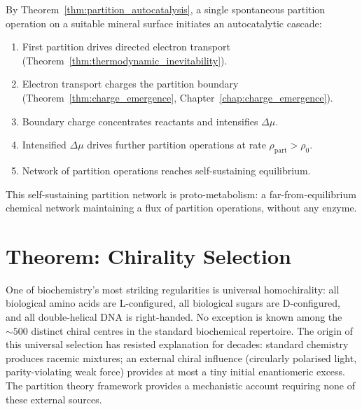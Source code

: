 \begin{corollary}
\label{cor:partition_cascade}
By Theorem~\ref{thm:partition_autocatalysis}, a single spontaneous partition
operation on a suitable mineral surface initiates an autocatalytic cascade:
\begin{enumerate}[label=(\arabic*)]
  \item First partition drives directed electron transport (Theorem~\ref{thm:thermodynamic_inevitability}).
  \item Electron transport charges the partition boundary
        (Theorem~\ref{thm:charge_emergence}, Chapter~\ref{chap:charge_emergence}).
  \item Boundary charge concentrates reactants and intensifies $\Delta\mu$.
  \item Intensified $\Delta\mu$ drives further partition operations at rate
        $\rho_{\mathrm{part}} > \rho_0$.
  \item Network of partition operations reaches self-sustaining equilibrium.
\end{enumerate}
This self-sustaining partition network is proto-metabolism: a far-from-equilibrium
chemical network maintaining a flux of partition operations, without any enzyme.
\end{corollary}

\section{Theorem: Chirality Selection}
\label{sec:chirality_selection}

One of biochemistry's most striking regularities is universal homochirality:
all biological amino acids are L-configured, all biological sugars are
D-configured, and all double-helical DNA is right-handed. No exception is known
among the $\sim 500$ distinct chiral centres in the standard biochemical repertoire.
The origin of this universal selection has resisted explanation for decades:
standard chemistry produces racemic mixtures; an external chiral influence
(circularly polarised light, parity-violating weak force) provides at most
a tiny initial enantiomeric excess. The partition theory framework provides
a mechanistic account requiring none of these external sources.

